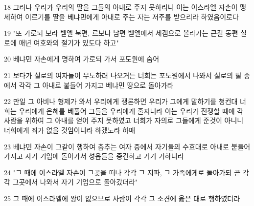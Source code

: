 \par 18 그러나 우리가 우리의 딸을 그들의 아내로 주지 못하리니 이는 이스라엘 자손이 맹세하여 이르기를 딸을 베냐민에게 아내로 주는 자는 저주를 받으리라 하였음이로다
\par 19 "또 가로되 보라 벧엘 북편, 르보나 남편 벧엘에서 세겜으로 올라가는 큰길 동편 실로에 매년 여호와의 절기가 있도다 하고"
\par 20 베냐민 자손에게 명하여 가로되 가서 포도원에 숨어
\par 21 보다가 실로의 여자들이 무도하러 나오거든 너희는 포도원에서 나와서 실로의 딸 중에서 각각 그 아내로 붙들어 가지고 베냐민 땅으로 돌아가라
\par 22 만일 그 아비나 형제가 와서 우리에게 쟁론하면 우리가 그에게 말하기를 청컨대 너희는 우리에게 은혜를 베풀어 그들을 우리에게 줄지니라 이는 우리가 전쟁할 때에 각 사람을 위하여 그 아내를 얻어 주지 못하였고 너희가 자의로 그들에게 준것이 아니니 너희에게 죄가 없을 것임이니라 하겠노라 하매
\par 23 베냐민 자손이 그같이 행하여 춤추는 여자 중에서 자기들의 수효대로 아내로 붙들어 가지고 자기 기업에 돌아가서 성읍들을 중건하고 거기 거하니라
\par 24 "그 때에 이스라엘 자손이 그곳을 떠나 각각 그 지파, 그 가족에게로 돌아가되 곧 각각 그곳에서 나와서 자기 기업으로 돌아갔더라"
\par 25 그 때에 이스라엘에 왕이 없으므로 사람이 각각 그 소견에 옳은 대로 행하였더라


